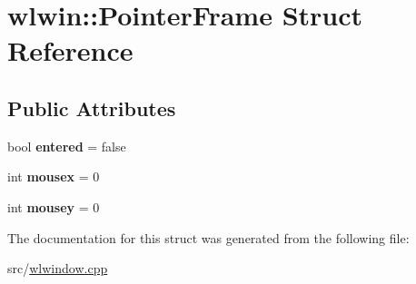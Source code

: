 \hypertarget{structwlwin_1_1PointerFrame}{}\section{wlwin\+::Pointer\+Frame Struct Reference}
\label{structwlwin_1_1PointerFrame}
\subsection*{Public Attributes}
\begin{DoxyCompactItemize}
\item 
\mbox{\label{structwlwin_1_1PointerFrame_aad02d428433744e99bf5cd170425f53a}} 
bool {\bfseries entered} = false
\item 
\mbox{\label{structwlwin_1_1PointerFrame_ace2327fce40e040fbc614306bc203a89}} 
int {\bfseries mousex} = 0
\item 
\mbox{\label{structwlwin_1_1PointerFrame_af146e5bf6dd7c308b7dbdc58b06cf15c}} 
int {\bfseries mousey} = 0
\end{DoxyCompactItemize}


The documentation for this struct was generated from the following file\+:\begin{DoxyCompactItemize}
\item 
src/\mbox{\hyperlink{wlwindow_8cpp}{wlwindow.\+cpp}}\end{DoxyCompactItemize}
